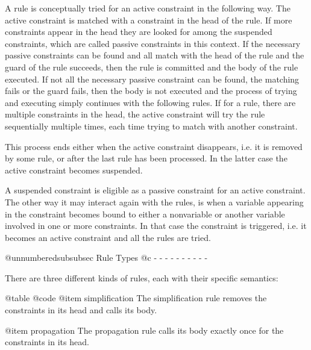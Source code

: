 A rule is conceptually tried for an active constraint in the following
way. The active constraint is matched with a constraint in the head of
the rule. If more constraints appear in the head they are looked for
among the suspended constraints, which are called passive constraints in
this context. If the necessary passive constraints can be found and all
match with the head of the rule and the guard of the rule succeeds, then
the rule is committed and the body of the rule executed. If not all the
necessary passive constraint can be found, the matching fails or the
guard fails, then the body is not executed and the process of trying and
executing simply continues with the following rules. If for a rule,
there are multiple constraints in the head, the active constraint will
try the rule sequentially multiple times, each time trying to match with
another constraint.

This process ends either when the active constraint disappears, i.e. it
is removed by some rule, or after the last rule has been processed. In
the latter case the active constraint becomes suspended.

A suspended constraint is eligible as a passive constraint for an active
constraint. The other way it may interact again with the rules, is when
a variable appearing in the constraint becomes bound to either a nonvariable
or another variable involved in one or more constraints. In that case the
constraint is triggered, i.e. it becomes an active constraint and all
the rules are tried.

@unnumberedsubsubsec Rule Types
@c - - - - - - - - - - 

There are three different kinds of rules, each with their specific semantics:

@table @code
@item simplification
The simplification rule removes the constraints in its head and calls its body.

@item propagation
The propagation rule calls its body exactly once for the constraints in
its head.

